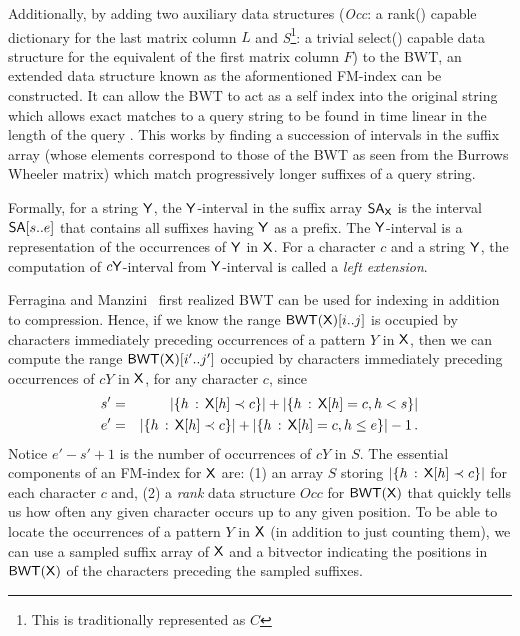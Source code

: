 Additionally, by adding two auxiliary data structures (\emph{Occ}: a rank() capable dictionary for the last matrix column $L$ and \emph{S}\footnote{This is traditionally represented as $C$}: a trivial select() capable data structure for the equivalent of the first matrix column $F$) to the BWT, an extended data structure known as the aformentioned FM-index can be constructed. It can allow the BWT to act as a self index into the original string which allows exact matches to a query string to be found in time linear in the length of the query \cite{ferragina2000opportunistic}.  This works by finding a succession of intervals in the suffix array (whose elements correspond to those of the BWT as seen from the Burrows Wheeler matrix) which match progressively longer suffixes of a query string.



Formally, for a string $\mathsf{Y}$, the $\mathsf{Y}$-interval in the suffix array $\mbox{\rm {\sf SA}}_{\mathsf{X}}$ is
the interval $\mbox{\rm {\sf SA}}[s..e]$ that contains all suffixes having $\mathsf{Y}$ as a
prefix. The $\mathsf{Y}$-interval is a representation of the occurrences of
$\mathsf{Y}$ in $\mathsf{X}$. For a character $c$ and a string $\mathsf{Y}$, the computation
of $c\mathsf{Y}$-interval from $\mathsf{Y}$-interval is called a \emph{left extension}.







Ferragina and Manzini~\cite{fm2005} first  realized BWT can be used for indexing in addition to compression.   Hence, if we know the range \(\mbox{\rm {\sf BWT}} (\mathsf{X}) [i..j]\) is occupied by characters immediately preceding occurrences of a pattern $Y$ in $\mathsf{X}$, then we can compute the range \(\mbox{\rm {\sf BWT}} (\mathsf{X}) [i'..j']\) occupied by characters immediately preceding occurrences of \(c Y\) in $\mathsf{X}$, for any character $c$, since
\begin{eqnarray*}
s' & = & |\{h\,:\,\mathsf{X} [h] \prec c\}| + |\{h\,:\,\mathsf{X} [h] = c, h < s\}| \\
e' & =  & |\{h\,:\,\mathsf{X} [h] \prec c\}| + |\{h\,:\, \mathsf{X} [h] = c, h \leq e\}| - 1\,.
\end{eqnarray*}
Notice \(e' - s' + 1\) is the number of occurrences of \(c Y\) in $S$.  The essential components of an FM-index for $\mathsf{X}$ are: (1) an array $S$ storing \(|\{h\,:\,\mathsf{X} [h] \prec c\}|\) for each character $c$ and, (2) a {\em rank} data structure $Occ$ for \(\mbox{\rm {\sf BWT}} (\mathsf{X})\) that quickly tells us how often any given character occurs up to any given position. To be able to locate the occurrences of a pattern $Y$ in $\mathsf{X}$ (in addition to just counting them), we can use a sampled suffix array of $\mathsf{X}$ and a bitvector indicating the positions in \(\mbox{\rm {\sf BWT}} (\mathsf{X})\) of the characters preceding the sampled suffixes.

